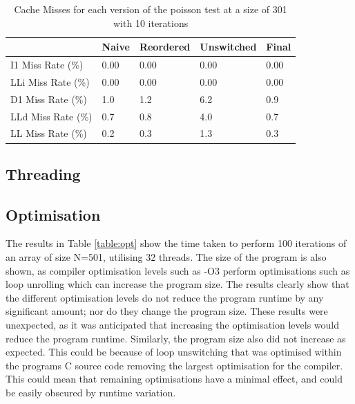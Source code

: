 \documentclass[12pt]{article}
\begin{document}
\begin{table}[H]
    \centering
    \caption{Cache Misses for each version of the poisson test at a size of 301 with 10 iterations}
    \label{table:cache}
    \begin{tabular}{ | m{4cm} | m{2cm} | m{2cm} | m{2cm} | m{2cm} | }
        \hline
        & Naive & Reordered & Unswitched & Final\\
        \hline
        I1 Miss Rate (\%) & 0.00 & 0.00 & 0.00 & 0.00 \\
        \hline
        LLi Miss Rate (\%) & 0.00 & 0.00 & 0.00 & 0.00\\
        \hline
        D1 Miss Rate (\%) & 1.0 & 1.2 & 6.2 & 0.9\\
        \hline
        LLd Miss Rate (\%) & 0.7 & 0.8 & 4.0 & 0.7\\
        \hline
        LL Miss Rate (\%) & 0.2 & 0.3 & 1.3 & 0.3\\
        \hline
        
    \end{tabular}
\end{table}

\subsection{Threading}

\subsection{Optimisation}
The results in Table \ref{table:opt} show the time taken to perform 100 iterations of an array of size N=501,
utilising 32 threads. The size of the program is also shown, as compiler optimisation levels such as -O3 perform
optimisations such as loop unrolling which can increase the program size. The results clearly show that the
different optimisation levels do not reduce the program runtime by any significant amount; nor do they change
the program size. These results were unexpected, as it was anticipated that increasing the optimisation levels
would reduce the program runtime. Similarly, the program size also did not increase as expected. This could be
because of loop unswitching that was optimised within the programs C source code removing the largest optimisation
for the compiler. This could mean that remaining optimisations have a minimal effect, and could be easily
obscured by runtime variation. 
\end{document}
